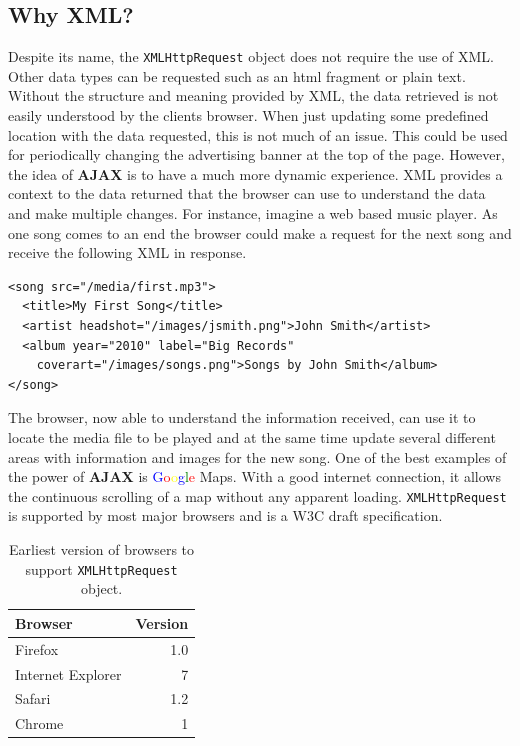 \documentclass[10pt,a4paper]{article}
\begin{document}
\subsection{Why XML?}
Despite its name, the \texttt{XMLHttpRequest} object does not require the use of XML\cite{MDN:XML}. Other data types can be requested such as an html fragment or plain text. Without the structure and meaning provided by XML, the data retrieved is not easily understood by the clients browser. When just updating some predefined location with the data requested, this is not much of an issue. This could be used for periodically changing the advertising banner at the top of the page. However, the idea of \textbf{AJAX} is to have a much more dynamic experience. XML provides a context to the data returned that the browser can use to understand the data and make multiple changes. For instance, imagine a web based music player. As one song comes to an end the browser could make a request for the next song and receive the following XML in response.

\begin{verbatim}
<song src="/media/first.mp3">
  <title>My First Song</title>
  <artist headshot="/images/jsmith.png">John Smith</artist>
  <album year="2010" label="Big Records"
  	coverart="/images/songs.png">Songs by John Smith</album>
</song>
\end{verbatim}

The browser, now able to understand the information received, can use it to locate the media file to be played and at the same time update several different areas with information and images for the new song. One of the best examples of the power of \textbf{AJAX} is \textcolor{blue}{G}\textcolor{red}{o}\textcolor{yellow}{o}\textcolor{blue}{g}\textcolor{green}{l}\textcolor{red}{e} Maps\cite{Google:maps}. With a good internet connection, it allows the continuous scrolling of a map without any apparent loading. \texttt{XMLHttpRequest} is supported by most major browsers\cite{MDN:XML} and is a W3C draft specification\cite{W3C:XML}.
\begin{table}[h]
	\centering
	\begin{tabular}{|l|r|}
	\hline
	\textbf{Browser} & \textbf{Version}\\
	\hline
	Firefox & 1.0\\
	\hline
	Internet Explorer & 7\\
	\hline
	Safari & 1.2\\
	\hline
	Chrome & 1\\
	\hline
	\end{tabular}
	\caption{Earliest version of browsers to support \texttt{XMLHttpRequest} object\cite{MDN:XML}.}
	\label{tab:support}
\end{table}

\newpage
\listoffigures

\newpage
{}

\end{document}
